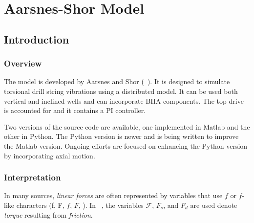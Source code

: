 \chapter{Aarsnes-Shor Model}
\label{ch:aarnessshormodel}

\section{Introduction}
\subsection{Overview}
The model is developed by Aarsnes and Shor (~\cite{ref:aarsnes2017a}). It is designed to simulate torsional drill string vibrations using a distributed model. It can be used both vertical and inclined wells and can incorporate BHA components. The top drive is accounted for and it contains a PI controller.

Two versions of the source code are available, one implemented in Matlab and the other in Python. The Python version is newer and is being written to improve the Matlab version. Ongoing efforts are focused on enhancing the Python version by incorporating axial motion.

\subsection{Interpretation}
In many sources, \emph{linear forces} are often represented by variables that use $f$ or $f$-like characters (f, F, $f$, $F$, ). In ~\cite{ref:aarsnes2017a}, the variables $\mathcal{F}$, $F_s$, and $F_d$ are used denote \emph{torque} resulting from \emph{friction}.

